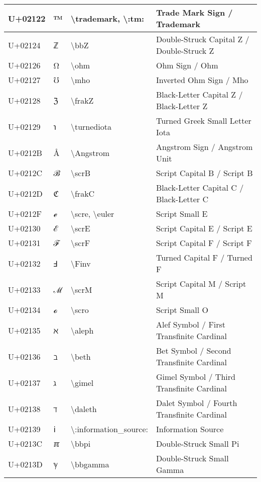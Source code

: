 \begin{table}[h]
\begin{tabulary}{\linewidth}{|L|L|L|L|}
\hline
U+02122 & ™ & {\textbackslash}trademark, {\textbackslash}:tm: & Trade Mark Sign / Trademark \\
\hline
U+02124 & ℤ & {\textbackslash}bbZ & Double-Struck Capital Z / Double-Struck Z \\
\hline
U+02126 & Ω & {\textbackslash}ohm & Ohm Sign / Ohm \\
\hline
U+02127 & ℧ & {\textbackslash}mho & Inverted Ohm Sign / Mho \\
\hline
U+02128 & ℨ & {\textbackslash}frakZ & Black-Letter Capital Z / Black-Letter Z \\
\hline
U+02129 & ℩ & {\textbackslash}turnediota & Turned Greek Small Letter Iota \\
\hline
U+0212B & Å & {\textbackslash}Angstrom & Angstrom Sign / Angstrom Unit \\
\hline
U+0212C & ℬ & {\textbackslash}scrB & Script Capital B / Script B \\
\hline
U+0212D & ℭ & {\textbackslash}frakC & Black-Letter Capital C / Black-Letter C \\
\hline
U+0212F & ℯ & {\textbackslash}scre, {\textbackslash}euler & Script Small E \\
\hline
U+02130 & ℰ & {\textbackslash}scrE & Script Capital E / Script E \\
\hline
U+02131 & ℱ & {\textbackslash}scrF & Script Capital F / Script F \\
\hline
U+02132 & Ⅎ & {\textbackslash}Finv & Turned Capital F / Turned F \\
\hline
U+02133 & ℳ & {\textbackslash}scrM & Script Capital M / Script M \\
\hline
U+02134 & ℴ & {\textbackslash}scro & Script Small O \\
\hline
U+02135 & ℵ & {\textbackslash}aleph & Alef Symbol / First Transfinite Cardinal \\
\hline
U+02136 & ℶ & {\textbackslash}beth & Bet Symbol / Second Transfinite Cardinal \\
\hline
U+02137 & ℷ & {\textbackslash}gimel & Gimel Symbol / Third Transfinite Cardinal \\
\hline
U+02138 & ℸ & {\textbackslash}daleth & Dalet Symbol / Fourth Transfinite Cardinal \\
\hline
U+02139 & ℹ & {\textbackslash}:information\_source: & Information Source \\
\hline
U+0213C & ℼ & {\textbackslash}bbpi & Double-Struck Small Pi \\
\hline
U+0213D & ℽ & {\textbackslash}bbgamma & Double-Struck Small Gamma \\

\end{tabulary}
\end{table}
